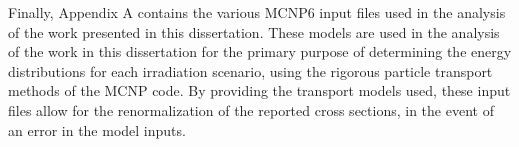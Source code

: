Finally, Appendix A  contains the various MCNP6 input files used in the analysis of the work presented in this dissertation. 
These models are  used in the analysis of the work in this dissertation for the primary purpose of determining the energy distributions for each irradiation scenario, using the rigorous particle transport methods of the MCNP code.
By providing the transport models used, these input files allow for the renormalization of the reported cross sections, in the event of an error in the model inputs.


